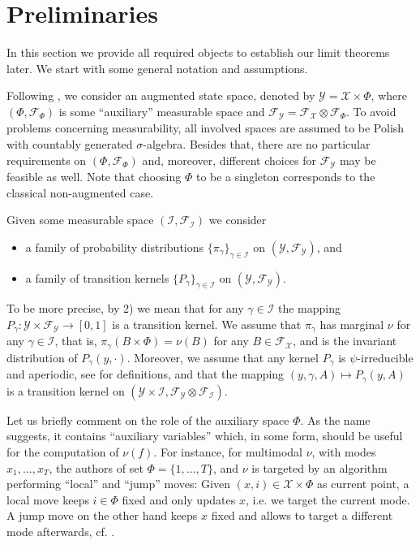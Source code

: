 \documentclass[12pt]{article}
\theoremstyle{definition}
\newcommand{\cX}{\mathcal{X}}
\newcommand{\cY}{\mathcal{Y}}
\begin{document}
\section{Preliminaries}\label{sec:preliminaries}

In this section we provide all required objects to establish our limit theorems later. 
We start with some general notation and assumptions. 

Following \cite{Pompe_2020Framework}, we consider an augmented state space, denoted by $\cY = \cX \times \Phi$, where $(\Phi, \mathcal{F}_\Phi)$ is some ``auxiliary'' measurable space and $\mathcal{F}_{\cY} = \mathcal{F}_\cX \otimes \mathcal{F}_\Phi$. 
To avoid problems concerning measurability, all involved spaces are assumed to be Polish with countably generated $\sigma$-algebra.  
Besides that, there are no particular requirements on $(\Phi, \mathcal{F}_\Phi)$ and, moreover, different choices for $\mathcal{F}_\cY$ may be feasible as well.
Note that choosing $\Phi $ to be a singleton corresponds to the classical non-augmented case.  

Given some measurable space $(\mathcal{I}, \mathcal{F}_{\mathcal{I}})$ we consider 
\begin{itemize}
	\item[1)] a family of probability distributions $\{{\pi}_\gamma\}_{\gamma \in \mathcal{I}}$ on $(\cY, \mathcal{F}_{\cY})$, and
	\item[2)] a family of transition kernels $\{ {P}_\gamma \}_{\gamma \in \mathcal{I}}$ on $(\cY, \mathcal{F}_{\cY})$.
\end{itemize}

To be more precise, by 2) we mean that for any $\gamma \in \mathcal{I}$ the mapping ${P}_\gamma \colon \cY \times \mathcal{F}_{\cY} \to [0,1]$ is a transition kernel. We assume that ${\pi}_\gamma$ has marginal $\nu$ for any $\gamma \in \mathcal{I}$, that is, ${\pi_\gamma}(B \times \Phi) = \nu(B)$ for any $B \in \mathcal{F}_\cX$, and is the invariant distribution of ${P}_\gamma({y}, \cdot )$.
Moreover, we assume that any kernel $P_\gamma$ is $\psi$-irreducible and aperiodic, see \cite{meyn2012markov} for definitions, and that the mapping $(y,\gamma,A) \mapsto P_\gamma(y, A)$ is a transition kernel on $(\cY \times \mathcal{I}, \mathcal{F}_\cY \otimes \mathcal{F}_{\mathcal{I}})$.


	Let us briefly comment on the role of the auxiliary space $\Phi$. 
	As the name suggests, it contains ``auxiliary variables'' which, in some form, should be useful for the computation of $\nu(f)$. 
	For instance, for multimodal $\nu$, with modes $x_1 , \dots , x_T$, the authors of \cite{Pompe_2020Framework} set $\Phi= \{1, \dots, T\}$, and $\nu$ is targeted by an algorithm performing ``local'' and ``jump'' moves: 
	Given $(x,i) \in \cX \times \Phi$ as current point, a local move keeps $i \in \Phi$ fixed and only updates $x$, i.e. we target the current mode. 
	A jump move on the other hand keeps $x$ fixed and allows to target a different mode afterwards, cf. \cite[Section 2]{Pompe_2020Framework}. 
\end{document}
